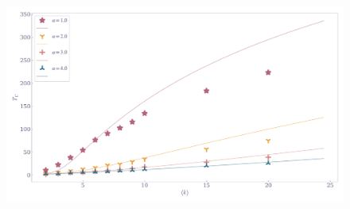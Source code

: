 \documentclass[11pt,a4paper]{article}
\begin{document}
\begin{figure}[ht!]
    \includegraphics[width=\linewidth]{../figures/TC_vs_k.pdf}
\end{figure}
\end{document}
